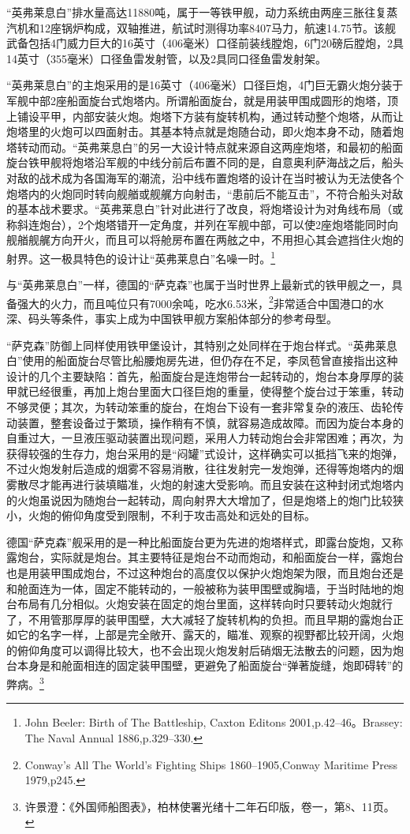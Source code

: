 \documentclass[12pt,UTF8]{ctexbook}
\begin{document}
“英弗莱息白”排水量高达11880吨，属于一等铁甲舰，动力系统由两座三胀往复蒸汽机和12座锅炉构成，双轴推进，航试时测得功率8407马力，航速14.75节。该舰武备包括4门威力巨大的16英寸（406毫米）口径前装线膛炮，6门20磅后膛炮，2具14英寸（355毫米）口径鱼雷发射管，以及2具同口径鱼雷发射架。

“英弗莱息白”的主炮采用的是16英寸（406毫米）口径巨炮，4门巨无霸火炮分装于军舰中部2座船面旋台式炮塔内。所谓船面旋台，就是用装甲围成圆形的炮塔，顶上铺设平甲，内部安装火炮。炮塔下方装有旋转机构，通过转动整个炮塔，从而让炮塔里的火炮可以四面射击。其基本特点就是炮随台动，即火炮本身不动，随着炮塔转动而动。“英弗莱息白”的另一大设计特点就来源自这两座炮塔，和最初的船面旋台铁甲舰将炮塔沿军舰的中线分前后布置不同的是，自意奥利萨海战之后，船头对敌的战术成为各国海军的潮流，沿中线布置炮塔的设计在当时被认为无法使各个炮塔内的火炮同时转向舰艏或舰艉方向射击，“患前后不能互击”，不符合船头对敌的基本战术要求。“英弗莱息白”针对此进行了改良，将炮塔设计为对角线布局（或称斜连炮台），2个炮塔错开一定角度，并列在军舰中部，可以使2座炮塔能同时向舰艏舰艉方向开火，而且可以将舱房布置在两舷之中，不用担心其会遮挡住火炮的射界。这一极具特色的设计让“英弗莱息白”名噪一时。\footnote{John Beeler: Birth of The Battleship, Caxton Editons 2001,p.42--46。Brassey: The Naval Annual 1886,p.329--330.}

与“英弗莱息白”一样，德国的“萨克森”也属于当时世界上最新式的铁甲舰之一，具备强大的火力，而且吨位只有7000余吨，吃水6.53米，\footnote{Conway's All The World's Fighting Ships 1860--1905,Conway Maritime Press 1979,p245.}非常适合中国港口的水深、码头等条件，事实上成为中国铁甲舰方案船体部分的参考母型。

“萨克森”防御上同样使用铁甲堡设计，其特别之处同样在于炮台样式。“英弗莱息白”使用的船面旋台尽管比船腰炮房先进，但仍存在不足，李凤苞曾直接指出这种设计的几个主要缺陷：首先，船面旋台是连炮带台一起转动的，炮台本身厚厚的装甲就已经很重，再加上炮台里面大口径巨炮的重量，使得整个旋台过于笨重，转动不够灵便；其次，为转动笨重的旋台，在炮台下设有一套非常复杂的液压、齿轮传动装置，整套设备过于繁琐，操作稍有不慎，就容易造成故障。而因为旋台本身的自重过大，一旦液压驱动装置出现问题，采用人力转动炮台会非常困难；再次，为获得较强的生存力，炮台采用的是“闷罐”式设计，这样确实可以抵挡飞来的炮弹，不过火炮发射后造成的烟雾不容易消散，往往发射完一发炮弹，还得等炮塔内的烟雾散尽才能再进行装填瞄准，火炮的射速大受影响。而且安装在这种封闭式炮塔内的火炮虽说因为随炮台一起转动，周向射界大大增加了，但是炮塔上的炮门比较狭小，火炮的俯仰角度受到限制，不利于攻击高处和远处的目标。

德国“萨克森”舰采用的是一种比船面旋台更为先进的炮塔样式，即露台旋炮，又称露炮台，实际就是炮台。其主要特征是炮台不动而炮动，和船面旋台一样，露炮台也是用装甲围成炮台，不过这种炮台的高度仅以保护火炮炮架为限，而且炮台还是和舱面连为一体，固定不能转动的，一般被称为装甲围壁或胸墙，于当时陆地的炮台布局有几分相似。火炮安装在固定的炮台里面，这样转向时只要转动火炮就行了，不用管那厚厚的装甲围壁，大大减轻了旋转机构的负担。而且早期的露炮台正如它的名字一样，上部是完全敞开、露天的，瞄准、观察的视野都比较开阔，火炮的俯仰角度可以调得比较大，也不会出现火炮发射后硝烟无法散去的问题，因为炮台本身是和舱面相连的固定装甲围壁，更避免了船面旋台“弹著旋缝，炮即碍转”的弊病。\footnote{许景澄：《外国师船图表》，柏林使署光绪十二年石印版，卷一，第8、11页。}
\end{document}
